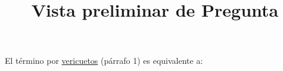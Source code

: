 \documentclass[a4paper,10pt]{article}\usepackage[utf8]{inputenc}\usepackage[spanish]{babel}\usepackage{times}
\title{Vista preliminar de Pregunta}
\begin{document}
\twocolumn 

\maketitle

El término por \underline{vericuetos} (párrafo 1) es equivalente a:
\end{document}
